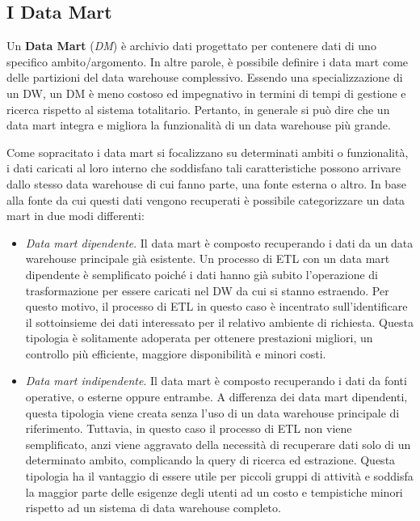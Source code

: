 \subsection{I Data Mart}

Un \textbf{Data Mart} (\textit{DM}) è archivio dati progettato per contenere dati di uno specifico ambito/argomento. In altre parole, è possibile definire i data mart come delle partizioni del data warehouse complessivo. Essendo una specializzazione di un DW, un DM è meno costoso ed impegnativo in termini di tempi di gestione e ricerca rispetto al sistema totalitario. Pertanto, in generale si può dire che un data mart integra e migliora la funzionalità di un data warehouse più grande.

Come sopracitato i data mart si focalizzano su determinati ambiti o funzionalità, i dati caricati al loro interno che soddisfano tali caratteristiche possono arrivare dallo stesso data warehouse di cui fanno parte, una fonte esterna o altro. In base alla fonte da cui questi dati vengono recuperati è possibile categorizzare un data mart in due modi differenti:\cite{itl_data_warehousing_and_mining}

\begin{itemize}
    \item \textit{Data mart dipendente}. Il data mart è composto recuperando i dati da un data warehouse principale già esistente. Un processo di ETL con un data mart dipendente è semplificato poiché i dati hanno già subito l’operazione di trasformazione per essere caricati nel DW da cui si stanno estraendo. Per questo motivo, il processo di ETL in questo caso è incentrato sull’identificare il sottoinsieme dei dati interessato per il relativo ambiente di richiesta. Questa tipologia è solitamente adoperata per ottenere prestazioni migliori, un controllo più efficiente, maggiore disponibilità e minori costi.
    \item \textit{Data mart indipendente}. Il data mart è composto recuperando i dati da fonti operative, o esterne oppure entrambe. A differenza dei data mart dipendenti, questa tipologia viene creata senza l’uso di un data warehouse principale di riferimento. Tuttavia, in questo caso il processo di ETL non viene semplificato, anzi viene aggravato della necessità di recuperare dati solo di un determinato ambito, complicando la query di ricerca ed estrazione. Questa tipologia ha il vantaggio di essere utile per piccoli gruppi di attività e soddisfa la maggior parte delle esigenze degli utenti ad un costo e tempistiche minori rispetto ad un sistema di data warehouse completo.
\end{itemize}

